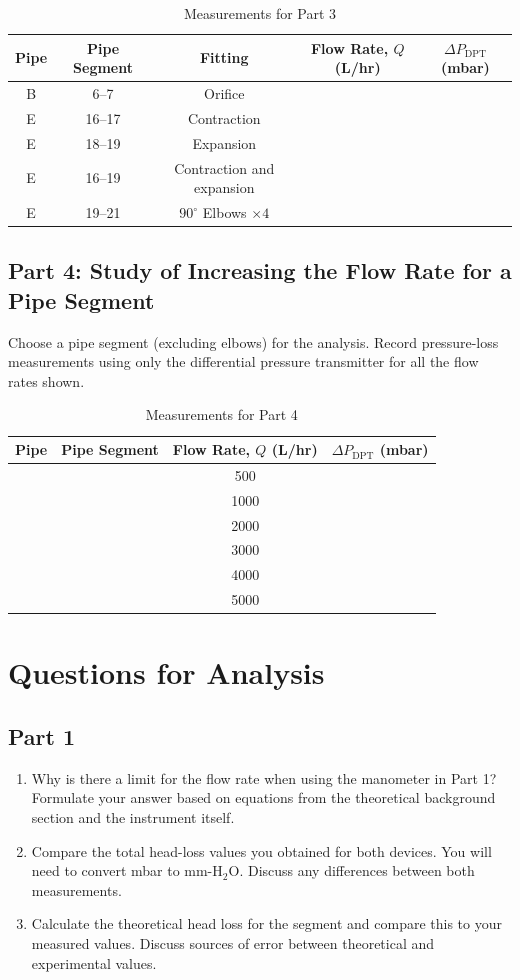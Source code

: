 \documentclass[12pt,letterpaper]{article}
\begin{document}
\begin{table}[H]
\centering
\caption{Measurements for Part 3}
\label{tab:part3}
\begin{tabular}{ccccc}
\toprule
Pipe & Pipe Segment & Fitting & Flow Rate, \(Q\) (L/hr) & \(\Delta P_{\text{DPT}}\) (mbar) \\
\midrule
B & 6--7 & Orifice & & \\
E & 16--17 & Contraction & & \\
E & 18--19 & Expansion & & \\
E & 16--19 & Contraction and expansion & & \\
E & 19--21 & \(90^\circ\) Elbows \(\times 4\) & & \\
\bottomrule
\end{tabular}
\end{table}

\subsection{Part 4: Study of Increasing the Flow Rate for a Pipe Segment}
Choose a pipe segment (excluding elbows) for the analysis. Record pressure-loss measurements using only the differential pressure transmitter for all the flow rates shown.

\begin{table}[H]
\centering
\caption{Measurements for Part 4}
\label{tab:part4}
\begin{tabular}{cccc}
\toprule
Pipe & Pipe Segment & Flow Rate, \(Q\) (L/hr) & \(\Delta P_{\text{DPT}}\) (mbar) \\
\midrule
 & & 500 & \\
 & & 1000 & \\
 & & 2000 & \\
 & & 3000 & \\
 & & 4000 & \\
 & & 5000 & \\
\bottomrule
\end{tabular}
\end{table}

\section{Questions for Analysis}

\subsection*{Part 1}
\begin{enumerate}[leftmargin=*]
    \item Why is there a limit for the flow rate when using the manometer in Part 1? Formulate your answer based on equations from the theoretical background section and the instrument itself.
    \item Compare the total head-loss values you obtained for both devices. You will need to convert mbar to mm-H\(_2\)O. Discuss any differences between both measurements.
    \item Calculate the theoretical head loss for the segment and compare this to your measured values. Discuss sources of error between theoretical and experimental values.
\end{enumerate}
\end{document}
